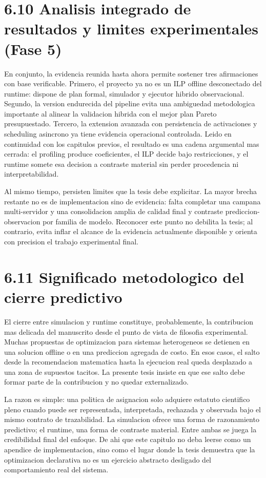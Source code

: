 \section{6.10 Analisis integrado de resultados y limites experimentales (Fase 5)}
En conjunto, la evidencia reunida hasta ahora permite sostener tres afirmaciones con base verificable. Primero, el proyecto ya no es un ILP offline desconectado del runtime: dispone de plan formal, simulador y ejecutor hibrido observacional. Segundo, la version endurecida del pipeline evita una ambiguedad metodologica importante al alinear la validacion hibrida con el mejor plan Pareto presupuestado. Tercero, la extension avanzada con persistencia de activaciones y scheduling asincrono ya tiene evidencia operacional controlada. Leido en continuidad con los capitulos previos, el resultado es una cadena argumental mas cerrada: el profiling produce coeficientes, el ILP decide bajo restricciones, y el runtime somete esa decision a contraste material sin perder procedencia ni interpretabilidad.

Al mismo tiempo, persisten limites que la tesis debe explicitar. La mayor brecha restante no es de implementacion sino de evidencia: falta completar una campana multi-servidor y una consolidacion amplia de calidad final y contraste prediccion-observacion por familia de modelo. Reconocer este punto no debilita la tesis; al contrario, evita inflar el alcance de la evidencia actualmente disponible y orienta con precision el trabajo experimental final.

\section{6.11 Significado metodologico del cierre predictivo}
El cierre entre simulacion y runtime constituye, probablemente, la contribucion mas delicada del manuscrito desde el punto de vista de filosofia experimental. Muchas propuestas de optimizacion para sistemas heterogeneos se detienen en una solucion offline o en una prediccion agregada de costo. En esos casos, el salto desde la recomendacion matematica hasta la ejecucion real queda desplazado a una zona de supuestos tacitos. La presente tesis insiste en que ese salto debe formar parte de la contribucion y no quedar externalizado.

La razon es simple: una politica de asignacion solo adquiere estatuto cientifico pleno cuando puede ser representada, interpretada, rechazada y observada bajo el mismo contrato de trazabilidad. La simulacion ofrece una forma de razonamiento predictivo; el runtime, una forma de contraste material. Entre ambas se juega la credibilidad final del enfoque. De ahi que este capitulo no deba leerse como un apendice de implementacion, sino como el lugar donde la tesis demuestra que la optimizacion declarativa no es un ejercicio abstracto desligado del comportamiento real del sistema.
